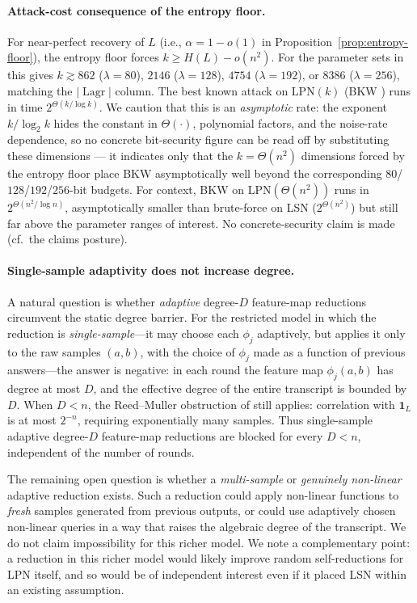 \documentclass[11pt,a4paper]{article}
\theoremstyle{plain}
\theoremstyle{definition}
\DeclareMathOperator{\Lagr}{Lagr}
\begin{document}
\paragraph{Attack-cost consequence of the entropy floor.} For near-perfect recovery of $L$ (i.e., $\alpha=1-o(1)$ in Proposition~\ref{prop:entropy-floor}), the entropy floor forces $k \geq H(L)-o(n^2)$. For the parameter sets in  this gives $k \gtrsim 862$ ($\lambda{=}80$), $2146$ ($\lambda{=}128$), $4754$ ($\lambda{=}192$), or $8386$ ($\lambda{=}256$), matching the $|\Lagr|$ column. The best known attack on $\mathrm{LPN}(k)$ (BKW \cite{BKW03}) runs in time $2^{\Theta(k/\log k)}$. We caution that this is an \emph{asymptotic} rate: the exponent $k/\log_2 k$ hides the constant in $\Theta(\cdot)$, polynomial factors, and the noise-rate dependence, so no concrete bit-security figure can be read off by substituting these dimensions --- it indicates only that the $k=\Theta(n^2)$ dimensions forced by the entropy floor place BKW asymptotically well beyond the corresponding $80$/$128$/$192$/$256$-bit budgets. For context, BKW on $\mathrm{LPN}(\Theta(n^2))$ runs in $2^{\Theta(n^2/\log n)}$, asymptotically smaller than brute-force on LSN ($2^{\Theta(n^2)}$) but still far above the parameter ranges of interest. No concrete-security claim is made (cf.\ the claims posture).

\paragraph{Single-sample adaptivity does not increase degree.} A natural question is whether \emph{adaptive} degree-$D$ feature-map reductions circumvent the static degree barrier. For the restricted model in which the reduction is \emph{single-sample}---it may choose each $\phi_j$ adaptively, but applies it only to the raw samples $(a,b)$, with the choice of $\phi_j$ made as a function of previous answers---the answer is negative: in each round the feature map $\phi_j(a,b)$ has degree at most $D$, and the effective degree of the entire transcript is bounded by $D$. When $D < n$, the Reed--Muller obstruction of  still applies: correlation with $\mathbf{1}_L$ is at most $2^{-n}$, requiring exponentially many samples. Thus single-sample adaptive degree-$D$ feature-map reductions are blocked for every $D < n$, independent of the number of rounds.

The remaining open question is whether a \emph{multi-sample} or \emph{genuinely non-linear} adaptive reduction exists. Such a reduction could apply non-linear functions to \emph{fresh} samples generated from previous outputs, or could use adaptively chosen non-linear queries in a way that raises the algebraic degree of the transcript. We do not claim impossibility for this richer model. We note a complementary point: a reduction in this richer model would likely improve random self-reductions for LPN itself, and so would be of independent interest even if it placed LSN within an existing assumption.
\end{document}

